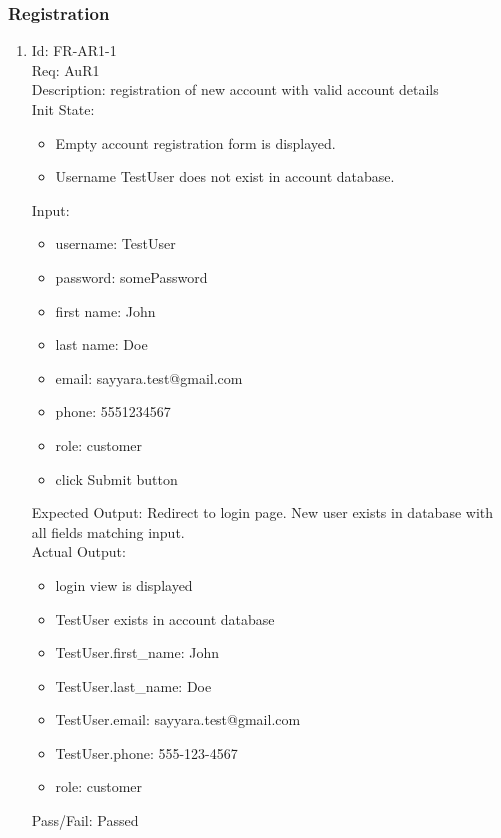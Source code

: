 \documentclass[12pt, titlepage]{article}
\begin{document}
\subsubsection{Registration}
\begin{enumerate}
    \item Id: FR-AR1-1\\
    Req: AuR1\\
    Description: registration of new account with valid account details\\
    Init State: \begin{itemize}[noitemsep,topsep=0pt]
        \item Empty account registration form is displayed.
        \item Username TestUser does not exist in account database.
    \end{itemize}
    Input: \begin{itemize}[noitemsep,topsep=0pt]
        \item username: TestUser
        \item password: somePassword
        \item first name: John
        \item last name: Doe
        \item email: sayyara.test@gmail.com
        \item phone: 5551234567
        \item role: customer
        \item click Submit button
    \end{itemize}
    Expected Output: Redirect to login page. New user exists in database with all fields matching input.\\
    Actual Output: \begin{itemize}[noitemsep,topsep=0pt]
        \item login view is displayed
        \item TestUser exists in account database
        \item TestUser.first\_name: John
        \item TestUser.last\_name: Doe
        \item TestUser.email: sayyara.test@gmail.com
        \item TestUser.phone: 555-123-4567
        \item role: customer
    \end{itemize}
    Pass/Fail: Passed


\end{enumerate}
\end{document}
